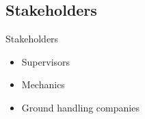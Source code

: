 \subsection{Stakeholders}
\begin{frame}{Stakeholders}{}
\begin{itemize}
	\item Supervisors
	\item Mechanics
	\item Ground handling companies
\end{itemize}
\end{frame}